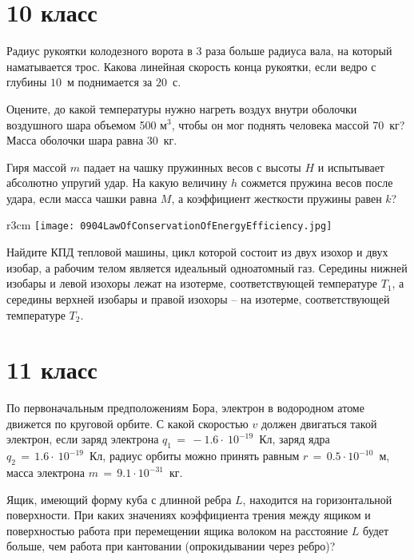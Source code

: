 \section{10 класс}

\AddProb Радиус рукоятки колодезного ворота в $3$ раза больше радиуса вала, на который наматывается трос. 
Какова линейная скорость конца рукоятки, если ведро с глубины $10$~м поднимается за $20$~с.

\AddProb Оцените, до какой температуры нужно нагреть воздух внутри оболочки воздушного шара объемом 500 м$^3$, 
чтобы он мог поднять человека массой 70~кг? Масса оболочки шара равна 30~кг.

\AddProb Гиря массой $m$ падает на чашку пружинных весов с высоты $H$ и испытывает абсолютно упругий удар. 
На какую величину $h$ сожмется пружина весов после удара, если масса чашки равна $M$, а коэффициент жесткости пружины равен $k$?

\begin{wrapfigure}{r}{3cm}
\texttt{[image: 0904LawOfConservationOfEnergyEfficiency.jpg]}
\end{wrapfigure}

\AddProb Найдите КПД тепловой машины, цикл которой состоит из двух изохор и двух изобар, а рабочим телом является идеальный одноатомный газ. 
Середины нижней изобары и левой изохоры лежат на изотерме, соответствующей температуре $T_1$, 
а середины верхней изобары и правой изохоры -- на изотерме, соответствующей температуре $T_2$.



\section{11 класс}

\AddProb По первоначальным предположениям Бора, электрон в водородном атоме движется по круговой орбите. 
С какой скоростью $v$ должен двигаться такой электрон, если заряд электрона $q_1\,=\,-1.6\cdot~10^{-19}$~Кл, 
заряд ядра $q_2\,=\,1.6\cdot~10^{-19}$~Кл, радиус орбиты можно принять равным $r\,=\,0.5\cdot 10^{-10}$~м, масса электрона $m\,=\,9.1\cdot 10^{-31}$~кг.

\AddProb Ящик, имеющий форму куба с длинной ребра $L$, находится на горизонтальной поверхности. 
При каких значениях коэффициента трения между ящиком и поверхностью работа при перемещении ящика волоком на расстояние $L$ будет больше, 
чем работа при кантовании (опрокидывании через ребро)?

